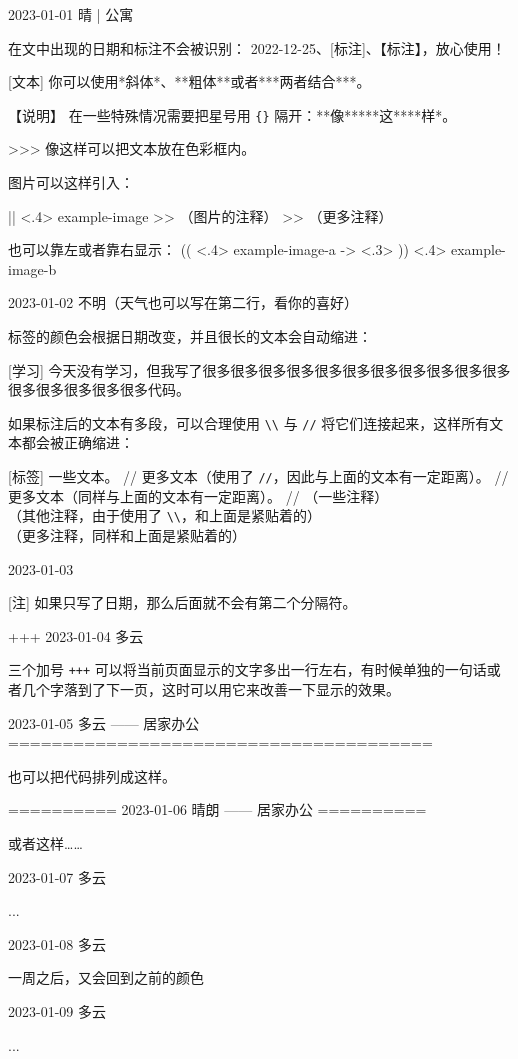 \documentclass[11pt, paperstyle=light yellow, color entry]{jwjournal}
\begin{document}
2023-01-01 晴 | 公寓

  在文中出现的日期和标注不会被识别： 2022-12-25、[标注]、【标注】，放心使用！

  [文本] 你可以使用*斜体*、**粗体**或者***两者结合***。

  【说明】 %
  在一些特殊情况需要把星号用 \texttt{\{\}} 隔开：**像**{}***这***{}*样*。

  >>> 像这样可以把文本放在色彩框内。

  图片可以这样引入：

  || <.4> {example-image} %
  >> （图片的注释）
  >> （更多注释）

  也可以靠左或者靠右显示：
  (( <.4> {example-image-a} %
  -> <.3> %
  )) <.4> {example-image-b} %



2023-01-02
不明（天气也可以写在第二行，看你的喜好）

  标签的颜色会根据日期改变，并且很长的文本会自动缩进：

  [学习] 今天没有学习，但我写了很多很多很多很多很多很多很多很多很多很多很多很多很多很多很多很多代码。

  如果标注后的文本有多段，可以合理使用 \texttt{\textbackslash\textbackslash} 与 \texttt{\slash\slash} 将它们连接起来，这样所有文本都会被正确缩进：

  [标签] 一些文本。
    //
    更多文本（使用了 \texttt{\slash\slash}，因此与上面的文本有一定距离）。
    //
    更多文本（同样与上面的文本有一定距离）。
    //
    （一些注释）
    \\
    （其他注释，由于使用了 \texttt{\textbackslash\textbackslash}，和上面是紧贴着的）
    \\
    （更多注释，同样和上面是紧贴着的）



2023-01-03

  [注] 如果只写了日期，那么后面就不会有第二个分隔符。


+++
2023-01-04  多云

  三个加号 \texttt{+++} 可以将当前页面显示的文字多出一行左右，有时候单独的一句话或者几个字落到了下一页，这时可以用它来改善一下显示的效果。



2023-01-05    多云        —— 居家办公
=======================================

也可以把代码排列成这样。


==========
2023-01-06    晴朗        —— 居家办公
==========

或者这样……



2023-01-07  多云

  ...



2023-01-08  多云

  一周之后，又会回到之前的颜色



2023-01-09  多云

  ...
\end{document}
